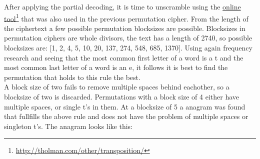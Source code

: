 \documentclass{uva-inf-bachelor-thesis}
\begin{document}
\vspace{20pt}
After applying the partial decoding, it is time to unscramble using the
\href{http://tholman.com/other/transposition/}{online tool}\footnote{\url{http://tholman.com/other/transposition/}}
that was also used in the previous permutation cipher. From the length of the
ciphertext a few possible permutation blocksizes are possible. Blocksizes in
permutation ciphers are whole divisors, the text has a length of 2740,
so possible blocksizes are: [1, 2, 4, 5, 10, 20, 137, 274, 548, 685, 1370].
Using again frequency research and seeing that the most common first letter of a
word is a t and the most common last letter of a word is an e\cite{Gutenberg},
it follows it is best to find the permutation that holds to this rule the best.\\

A block size of two fails to remove multiple spaces behind eachother, so a
blocksize of two is discarded. Permutations with a block size of 4 either have
multiple spaces, or single t's in them. At a blocksize of 5 a anagram was found
that fullfills the above rule and does not have the problem of multiple spaces
or singleton t's. The anagram looks like this:
\end{document}
